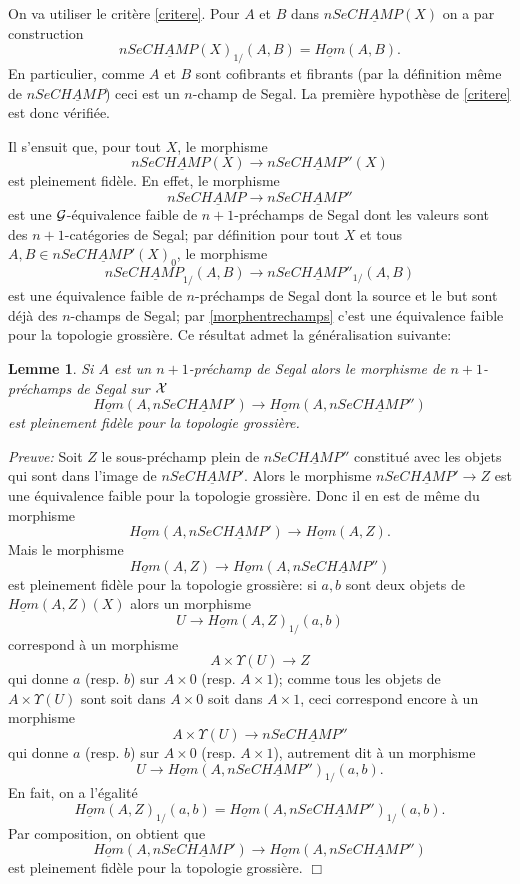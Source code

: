 \documentclass[12pt]{article}
\newcommand{\eop}{\hfill $\Box$\vspace{.1in}}
\newtheorem{lemme}[lemma]{Lemme}
\newcommand{\Gg}{{\cal G}}
\newcommand{\Xx}{{\cal X}}
\begin{document}
On va utiliser le crit\`ere \ref{critere}.
Pour $A$ et $B$ dans $nSe\underline{CHAMP}(X)$
on  a par construction
$$
nSe\underline{CHAMP}(X)_{1/} (A,B) = \underline{Hom}(A,B).
$$
En particulier, comme $A$ et $B$ sont cofibrants et fibrants (par
la d\'efinition m\^eme de $nSe\underline{CHAMP}$) ceci est un $n$-champ de
Segal.
La premi\`ere hypoth\`ese de \ref{critere} est donc v\'erifi\'ee.


Il s'ensuit que, pour tout $X$, le morphisme
$$
nSe\underline{CHAMP}(X)
\rightarrow
nSe\underline{CHAMP}''(X)
$$
est pleinement fid\`ele. En effet, le morphisme
$$
nSe\underline{CHAMP}
\rightarrow
nSe\underline{CHAMP}''
$$
est une $\Gg$-\'equivalence faible de $n+1$-pr\'echamps de
Segal dont les valeurs sont des $n+1$-cat\'egories de Segal; par d\'efinition
pour tout $X$ et tous $A,B\in nSe\underline{CHAMP}'(X)_0$, le morphisme
$$
nSe\underline{CHAMP}_{1/}(A,B)
\rightarrow
nSe\underline{CHAMP}''_{1/}(A,B)
$$
est une \'equivalence faible de $n$-pr\'echamps de Segal dont la
source et le but
sont d\'ej\`a des $n$-champs de Segal; par \ref{morphentrechamps}
c'est une \'equivalence faible pour la topologie grossi\`ere.
Ce r\'esultat admet la g\'en\'eralisation suivante:

\begin{lemme}
\label{hompleinfidele}
Si $A$ est un $n+1$-pr\'echamp de Segal alors le morphisme de
$n+1$-pr\'echamps de
Segal sur $\Xx$
$$
\underline{Hom}(A, nSe\underline{CHAMP}')\rightarrow
\underline{Hom}(A,nSe\underline{CHAMP}'')
$$
est pleinement fid\`ele pour la topologie grossi\`ere.
\end{lemme}
{\em Preuve:}
Soit $Z$ le sous-pr\'echamp plein de $nSe\underline{CHAMP}''$
constitu\'e avec les objets qui sont dans l'image de $nSe\underline{CHAMP}'$.
Alors le morphisme
$nSe\underline{CHAMP}'\rightarrow Z$ est une \'equivalence faible pour la
topologie grossi\`ere. Donc il en est de m\^eme du morphisme
$$
\underline{Hom}(A, nSe\underline{CHAMP}')\rightarrow
\underline{Hom}(A, Z).
$$
Mais le morphisme
$$
\underline{Hom}(A, Z)\rightarrow
\underline{Hom}(A, nSe\underline{CHAMP}'')
$$
est pleinement fid\`ele pour la topologie grossi\`ere: si $a,b$ sont
deux objets de $\underline{Hom}(A, Z)(X)$ alors un morphisme
$$
U\rightarrow \underline{Hom}(A, Z)_{1/}(a,b)
$$
correspond \`a un morphisme
$$
A\times \Upsilon (U)\rightarrow Z
$$
qui donne $a$ (resp. $b$) sur $A\times 0$ (resp. $A\times 1$);
comme tous les objets de   $A\times \Upsilon (U)$ sont soit dans
$A\times 0$ soit dans $A\times 1$, ceci
correspond encore \`a un morphisme
$$
A\times \Upsilon (U)\rightarrow nSe\underline{CHAMP}''
$$
qui donne $a$ (resp. $b$) sur $A\times 0$ (resp. $A\times 1$),
autrement dit \`a un morphisme
$$
U\rightarrow \underline{Hom}(A, nSe\underline{CHAMP}'')_{1/}(a,b).
$$
En fait, on a l'\'egalit\'e
$$
\underline{Hom}(A, Z)_{1/}(a,b)  =
\underline{Hom}(A, nSe\underline{CHAMP}'')_{1/}(a,b).
$$
Par composition, on obtient que
$$
\underline{Hom}(A, nSe\underline{CHAMP}')\rightarrow
\underline{Hom}(A, nSe\underline{CHAMP}'')
$$
est pleinement fid\`ele pour la topologie grossi\`ere.
\eop
\end{document}
